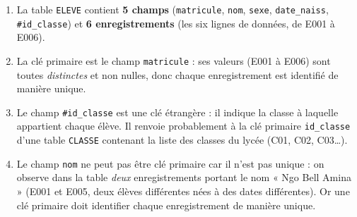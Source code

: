 \documentclass[11pt]{article}
\newcommand{\cle}[1]{{\popxbold\color{popdark}#1}}
\begin{document}
\begin{corrige}
\begin{enumerate}
\item La table \texttt{ELEVE} contient \textbf{5 champs} (\texttt{matricule}, \texttt{nom}, \texttt{sexe}, \texttt{date\_naiss}, \texttt{\#id\_classe}) et \textbf{6 enregistrements} (les six lignes de données, de E001 à E006).
\item La \cle{clé primaire} est le champ \texttt{matricule} : ses valeurs (E001 à E006) sont toutes \emph{distinctes} et non nulles, donc chaque enregistrement est identifié de manière unique.
\item Le champ \texttt{\#id\_classe} est une \cle{clé étrangère} : il indique la classe à laquelle appartient chaque élève. Il renvoie probablement à la clé primaire \texttt{id\_classe} d'une table \texttt{CLASSE} contenant la liste des classes du lycée (C01, C02, C03\dots).
\item Le champ \texttt{nom} ne peut pas être clé primaire car il n'est pas unique : on observe dans la table \emph{deux} enregistrements portant le nom « Ngo Bell Amina » (E001 et E005, deux élèves différentes nées à des dates différentes). Or une clé primaire doit identifier chaque enregistrement de manière unique.
\end{enumerate}
\end{corrige}
\end{document}
